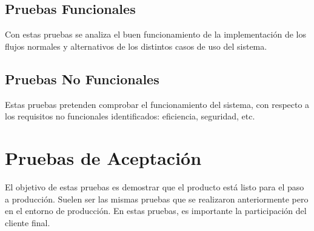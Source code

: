 \subsection{Pruebas Funcionales}
Con estas pruebas se analiza el buen funcionamiento de la implementación de los flujos normales y alternativos de los distintos casos de uso del sistema.

\subsection{Pruebas No Funcionales}
Estas pruebas pretenden comprobar el funcionamiento del sistema, con respecto a los requisitos no funcionales identificados: eficiencia, seguridad, etc.

\section{Pruebas de Aceptación}
El objetivo de estas pruebas es demostrar que el producto está listo para el paso a producción. Suelen ser las mismas pruebas que se realizaron anteriormente pero en el entorno de producción. En estas pruebas, es importante la participación del cliente final.